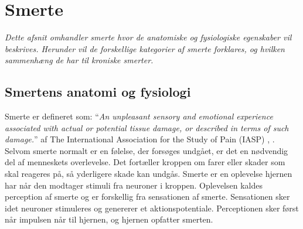 \section{Smerte}
\textit{Dette afsnit omhandler smerte hvor de anatomiske og fysiologiske egenskaber vil beskrives. Herunder vil de forskellige kategorier af smerte forklares, og hvilken sammenhæng de har til kroniske smerter.}

\subsection{Smertens anatomi og fysiologi}
Smerte er defineret som: “\textit{An unpleasant sensory and emotional experience associated with actual or potential tissue damage, or described in terms of such damage.}” af The International Association for the Study of Pain (IASP) \citep{Giangregorio1997}, \citep{Carmon}.\\
Selvom smerte normalt er en følelse, der forsøges undgået, er det en nødvendig del af menneskets overlevelse. Det fortæller kroppen om farer eller skader som skal reageres på, så yderligere skade kan undgås.
Smerte er en oplevelse hjernen har når den modtager stimuli fra neuroner i kroppen. Oplevelsen kaldes perception af smerte og er forskellig fra sensationen af smerte. Sensationen sker idet neuroner stimuleres og genererer et aktionspotentiale. Perceptionen sker først når impulsen når til hjernen, og hjernen opfatter smerten. 





